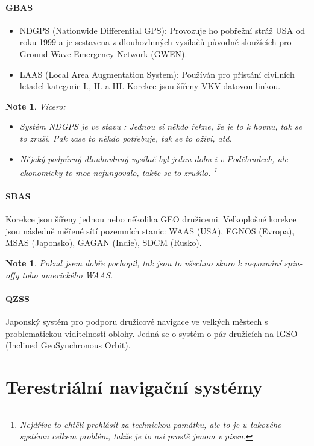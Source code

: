 \documentclass[11pt,a4paper]{article}
\theoremstyle{my-theorem}
\theoremstyle{non-theorem}
\newtheorem{note}[theorem]{Note}
\begin{document}
\paragraph*{GBAS}
\begin{itemize}
    \item NDGPS (Nationwide Differential GPS): Provozuje ho pobřežní stráž USA od roku 1999 a je sestavena z dlouhovlnných vysílačů původně sloužících pro Ground Wave Emergency Network (GWEN).
    \item LAAS (Local Area Augmentation System): Používán pro přistání civilních letadel kategorie I., II. a III. Korekce jsou šířeny VKV datovou linkou.
\end{itemize}
\begin{note} Vícero:
    \begin{itemize}
        \item Systém NDGPS je ve stavu : Jednou si někdo řekne, že je to k hovnu, tak se to zruší. Pak zase to někdo potřebuje, tak se to oživí, atd.
        \item Nějaký podpůrný dlouhovlnný vysílač byl jednu dobu i v Poděbradech, ale ekonomicky to moc nefungovalo, takže se to zrušilo.%
            \footnote{Nejdříve to chtěli prohlásit za technickou památku, ale to je u takového systému celkem problém, takže je to asi prostě jenom v pissu.}
    \end{itemize}
\end{note}

\paragraph*{SBAS}
Korekce jsou šířeny jednou nebo několika GEO družicemi. Velkoplošné korekce jsou následně měřené sítí pozemních stanic: WAAS (USA), EGNOS (Evropa), MSAS (Japonsko), GAGAN (Indie), SDCM (Rusko).
\begin{note}
    Pokud jsem dobře pochopil, tak jsou to všechno skoro k nepoznání spin-offy toho amerického WAAS.
\end{note}

\paragraph*{QZSS} Japonský systém pro podporu družicové navigace ve velkých městech s problematickou viditelností oblohy. Jedná se o systém o pár družicích na IGSO (Inclined GeoSynchronous Orbit).


\section{Terestriální navigační systémy}
\end{document}
